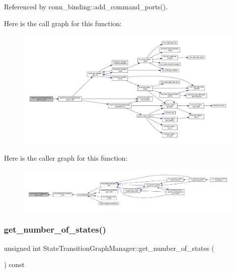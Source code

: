 Referenced by conn\+\_\+binding\+::add\+\_\+command\+\_\+ports().

Here is the call graph for this function\+:
\nopagebreak
\begin{figure}[H]
\begin{center}
\leavevmode
\includegraphics[width=350pt]{d9/dfd/classStateTransitionGraphManager_a36ced3a88fdbef82df4edc3bad8cc1b8_cgraph}
\end{center}
\end{figure}
Here is the caller graph for this function\+:
\nopagebreak
\begin{figure}[H]
\begin{center}
\leavevmode
\includegraphics[width=350pt]{d9/dfd/classStateTransitionGraphManager_a36ced3a88fdbef82df4edc3bad8cc1b8_icgraph}
\end{center}
\end{figure}
\mbox{\label{classStateTransitionGraphManager_a4ddb4b8f791ecffb4758dd4328b9f0fc}} 
\subsubsection{\texorpdfstring{get\+\_\+number\+\_\+of\+\_\+states()}{get\_number\_of\_states()}}
{\footnotesize\ttfamily unsigned int State\+Transition\+Graph\+Manager\+::get\+\_\+number\+\_\+of\+\_\+states (\begin{DoxyParamCaption}{ }\end{DoxyParamCaption}) const}

